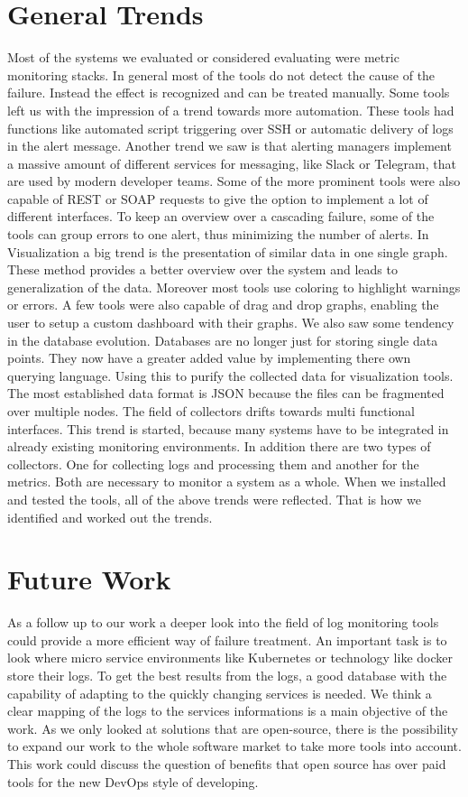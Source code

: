 \section{General Trends}
\label{generaltrends}
Most of the systems we evaluated or considered evaluating were metric monitoring stacks. In general most of the tools do not detect the cause of the failure. Instead the effect is recognized and can be treated manually. Some tools left us with the impression of a trend towards more automation. These tools had functions like automated script triggering over SSH or automatic delivery of logs in the alert message. 
Another trend we saw is that alerting managers implement a massive amount of different services for messaging, like Slack or Telegram, that are used by modern developer teams. Some of the more prominent tools were also capable of REST or SOAP requests to give the option to implement a lot of different interfaces. To keep an overview over a cascading failure, some of the tools can group errors to one alert, thus minimizing the number of alerts.
In Visualization a big trend is the presentation of similar data in one single graph. These method provides a better overview over the system and leads to generalization of the data. Moreover most tools use coloring to highlight warnings or errors. A few tools were also capable of drag and drop graphs, enabling the user to setup a custom dashboard with their graphs.
We also saw some tendency in the database evolution. Databases are no longer just for storing single data points. They now have a greater added value by implementing there own querying language. Using this to purify the collected data for visualization tools. The most established data format is JSON because the files can be fragmented over multiple nodes.
The field of collectors drifts towards multi functional interfaces. This trend is started, because many systems have to be integrated in already existing monitoring environments. In addition there are two types of collectors. One for collecting logs and processing them and another for the metrics. Both are necessary to monitor a system as a whole.
When we installed and tested the tools, all of the above trends were reflected. That is how we identified and worked out the trends. 

\section{Future Work}
\label{futurework}
As a follow up to our work a deeper look into the field of log monitoring tools could provide a more efficient way of failure treatment. An important task is to look where micro service environments like Kubernetes or technology like docker store their logs. To get the best results from the logs, a good database with the capability of adapting to the quickly changing services is needed. We think a clear mapping of the logs to the services informations is a main objective of the work.
As we only looked at solutions that are open-source, there is the possibility to expand our work to the whole software market to take more tools into account. This work could discuss the question of benefits that open source has over paid tools for the new DevOps style of developing.

